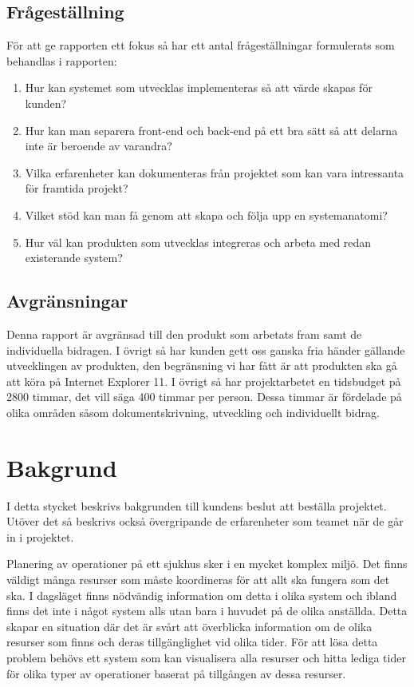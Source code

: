 \documentclass[a4paper,10pt]{article}
\begin{document}
\subsection{Frågeställning}
För att ge rapporten ett fokus så har ett antal frågeställningar formulerats som behandlas i rapporten:
\begin{enumerate}
	\item Hur kan systemet som utvecklas implementeras så att värde skapas för kunden?
	\item Hur kan man separera front-end och back-end på ett bra sätt så att delarna inte är beroende av varandra?
	\item Vilka erfarenheter kan dokumenteras från projektet som kan vara intressanta för framtida projekt?
	\item Vilket stöd kan man få genom att skapa och följa upp en systemanatomi?
	\item Hur väl kan produkten som utvecklas integreras och arbeta med redan existerande system?
\end{enumerate}

\subsection{Avgränsningar}
Denna rapport är avgränsad till den produkt som arbetats fram samt de individuella bidragen. I övrigt så har kunden gett oss ganska fria händer gällande utvecklingen av produkten, den begränsning vi har fått är att produkten ska gå att köra på Internet Explorer 11.
I övrigt så har projektarbetet en tidsbudget på 2800 timmar, det vill säga 400 timmar per person. Dessa timmar är fördelade på olika områden såsom dokumentskrivning, utveckling och individuellt bidrag.

\newpage

\section{Bakgrund}
I detta stycket beskrivs bakgrunden till kundens beslut att beställa projektet. Utöver det så beskrivs också övergripande de erfarenheter som teamet när de går in i projektet.

Planering av operationer på ett sjukhus sker i en mycket komplex miljö. Det finns väldigt många resurser som måste koordineras för att allt ska fungera som det ska.
I dagsläget finns nödvändig information om detta i olika system och ibland finns det inte i något system alls utan bara i huvudet på de olika anställda. Detta skapar en situation där det är svårt att överblicka information om de olika resurser som finns och deras tillgänglighet vid olika tider.
För att lösa detta problem behövs ett system som kan visualisera alla resurser och hitta lediga tider för olika typer av operationer baserat på tillgången av dessa resurser.
\end{document}
